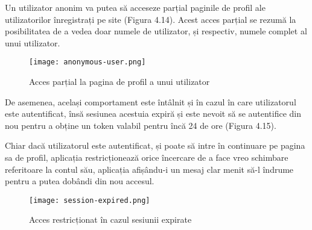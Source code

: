 Un utilizator anonim va putea să acceseze parțial paginile de profil ale utilizatorilor înregistrați pe site (Figura 4.14). Acest acces parțial se rezumă la posibilitatea de a vedea doar numele de utilizator, și respectiv, numele complet al unui utilizator.\newline
\bigskip

\begin{figure}[H]
	\begin{center}
		\texttt{[image: anonymous-user.png]}
		\caption{Acces parțial la pagina de profil a unui utilizator}
	\end{center}
\end{figure}
\bigskip

De asemenea, același comportament este întâlnit și în cazul în care utilizatorul este autentificat, însă sesiunea acestuia expiră și este nevoit să se autentifice din nou pentru a obține un token valabil pentru încă 24 de ore (Figura 4.15).\newline

Chiar dacă utilizatorul este autentificat, și poate să intre în continuare pe pagina sa de profil, aplicația restricționează orice încercare de a face vreo schimbare referitoare la contul său, aplicația afișându-i un mesaj clar menit să-l îndrume pentru a putea dobândi din nou accesul.\newline
\bigskip

\begin{figure}[H]
	\begin{center}
		\texttt{[image: session-expired.png]}
		\caption{Acces restricționat în cazul sesiunii expirate}
	\end{center}
\end{figure}

\label{chap:04}